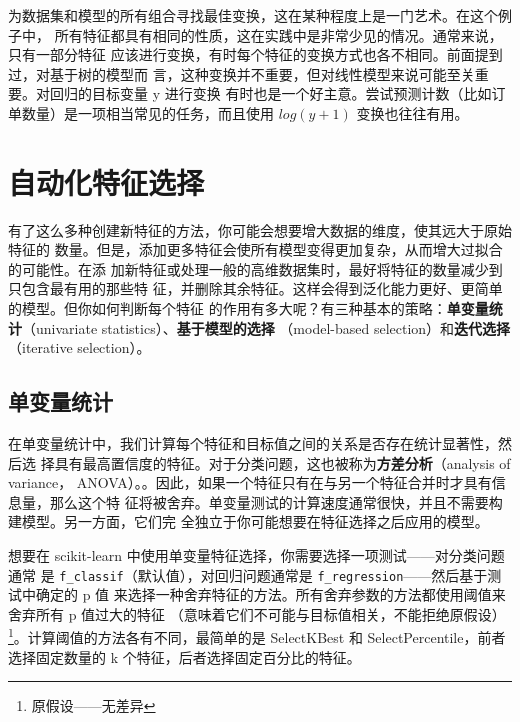 为数据集和模型的所有组合寻找最佳变换，这在某种程度上是一门艺术。在这个例子中，
所有特征都具有相同的性质，这在实践中是非常少见的情况。通常来说，只有一部分特征
应该进行变换，有时每个特征的变换方式也各不相同。前面提到过，对基于树的模型而
言，这种变换并不重要，但对线性模型来说可能至关重要。对回归的目标变量 y 进行变换
有时也是一个好主意。尝试预测计数（比如订单数量）是一项相当常见的任务，而且使用
$log(y + 1)$ 变换也往往有用。

\section{自动化特征选择}
有了这么多种创建新特征的方法，你可能会想要增大数据的维度，使其远大于原始特征的
数量。但是，添加更多特征会使所有模型变得更加复杂，从而增大过拟合的可能性。在添
加新特征或处理一般的高维数据集时，最好将特征的数量减少到只包含最有用的那些特
征，并删除其余特征。这样会得到泛化能力更好、更简单的模型。但你如何判断每个特征
的作用有多大呢？有三种基本的策略：\textbf{单变量统计}（univariate statistics）、\textbf{基于模型的选择}
（model-based selection）和\textbf{迭代选择}（iterative selection）。
\subsection{单变量统计}
在单变量统计中，我们计算每个特征和目标值之间的关系是否存在统计显著性，然后选
择具有最高置信度的特征。对于分类问题，这也被称为\textbf{方差分析}（analysis of variance，
ANOVA）。。因此，如果一个特征只有在与另一个特征合并时才具有信息量，那么这个特
征将被舍弃。单变量测试的计算速度通常很快，并且不需要构建模型。另一方面，它们完
全独立于你可能想要在特征选择之后应用的模型。

想要在 scikit-learn 中使用单变量特征选择，你需要选择一项测试——对分类问题通常
是 \verb|f_classif|（默认值），对回归问题通常是 \verb|f_regression|——然后基于测试中确定的 p 值
来选择一种舍弃特征的方法。所有舍弃参数的方法都使用阈值来舍弃所有 p 值过大的特征
（意味着它们不可能与目标值相关，不能拒绝原假设）\footnote{原假设——无差异}。计算阈值的方法各有不同，最简单的是 SelectKBest
和 SelectPercentile，前者选择固定数量的 k 个特征，后者选择固定百分比的特征。

